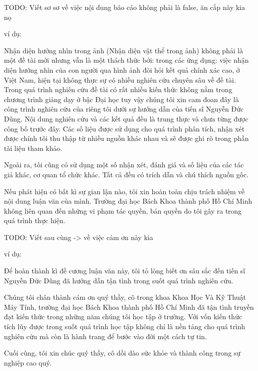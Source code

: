 \documentclass[12pt,a4paper,oneside]{book} %
\begin{document}

\coverpage

\frontmatter


\begin{declaration}
	TODO: Viết sơ sơ về việc nội dung báo cáo không phải là false, ăn cắp này kia nọ

	ví dụ:

	Nhận diện hướng nhìn trong ảnh (Nhận diện vật thể trong ảnh) không phải là một đề tài mới nhưng vẫn là một thách thức bởi: trong các ứng dụng: việc nhận diện hướng nhìn của con người qua hình ảnh đòi hỏi kết quả chính xác cao, ở Việt Nam, hiện tại không  thực sự có nhiều nghiên cứu chuyên sâu về đề tài. Trong quá trình nghiên cứu đề tài có rất nhiều kiến thức không nằm trong chương trình giảng dạy ở bậc Đại học tuy vậy chúng tôi xin cam đoan đây là công trình nghiên cứu của riêng tôi dưới sự hướng dẫn của tiến sĩ Nguyễn Đức Dũng. Nội dung nghiên cứu và các kết quả đều là trung thực và chưa từng được công bố trước đây. Các số liệu được sử dụng cho quá trình phân tích, nhận xét được chính tôi thu thập từ nhiều nguồn khác nhau và sẽ được ghi rõ trong phần tài liệu tham khảo.
 	
 	Ngoài ra, tôi cũng có sử dụng một số nhận xét, đánh giá và số liệu của các tác giả khác, cơ quan tổ chức khác. Tất cả đều có trích dẫn và chú thích nguồn gốc.
 	
 	Nếu phát hiện có bất kì sự gian lận nào, tôi xin hoàn toàn chịu trách nhiệm về nội dung luận văn của mình. Trường đại học Bách Khoa thành phố Hồ Chí Minh không liên quan đến những vi phạm tác quyền, bản quyền do tôi gây ra trong quá trình thực hiện.

\end{declaration}

\begin{acknowledgments}
	TODO: Viết sau cùng -> về việc cảm ơn này kia

	ví dụ:

	Để hoàn thành kì đề cương luận văn này, tôi tỏ lòng biết ơn sâu sắc đến tiến sĩ Nguyễn Đức Dũng đã hướng dẫn tận tình trong suốt quá trình nghiên cứu.
	
	Chúng tôi chân thành cám ơn quý thầy, cô trong khoa Khoa Học Và Kỹ Thuật Máy Tính, trường đại học Bách Khoa thành phố Hồ Chí Minh đã tận tình truyền đạt kiến thức trong những năm chúng tôi học tập ở trường. Với vốn kiến thức tích lũy được trong suốt quá trình học tập không chỉ là nền tảng cho quá trình nghiên cứu mà còn là hành trang để bước vào đời một cách tự tin.

	Cuối cùng, tôi xin chúc quý thầy, cô dồi dào sức khỏe và thành công trong sự nghiệp cao quý.
	
\end{acknowledgments}
	
\end{document}
